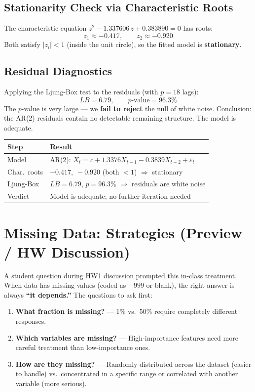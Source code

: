 \documentclass[11pt]{article}
\begin{document}
\subsection{Stationarity Check via Characteristic Roots}
The characteristic equation $z^2 - 1.337606\,z + 0.383890 = 0$ has roots:
\[
z_1 \approx -0.417, \qquad z_2 \approx -0.920
\]
Both satisfy $|z_i| < 1$ (inside the unit circle), so the fitted model is
\textbf{stationary}.

\subsection{Residual Diagnostics}
Applying the Ljung-Box test to the residuals (with $p = 18$ lags):
\[
LB = 6.79, \qquad p\text{-value} = 96.3\%
\]
The $p$-value is very large --- we \textbf{fail to reject} the null of white
noise. Conclusion: the AR(2) residuals contain no detectable remaining structure.
The model is adequate.

\begin{center}
\begin{tabular}{@{}ll@{}}
\toprule
\textbf{Step} & \textbf{Result} \\
\midrule
Model         & AR(2): $X_t = c + 1.3376 X_{t-1} - 0.3839 X_{t-2} + \varepsilon_t$ \\
Char.\ roots  & $-0.417,\; -0.920$ (both $< 1$) $\Rightarrow$ stationary \\
Ljung-Box     & $LB = 6.79$, $p = 96.3\%$ $\Rightarrow$ residuals are white noise \\
Verdict       & Model is adequate; no further iteration needed \\
\bottomrule
\end{tabular}
\end{center}


\section{Missing Data: Strategies (Preview / HW Discussion)}

A student question during HW1 discussion prompted this in-class treatment.
When data has missing values (coded as $-999$ or blank), the right answer is always
\textbf{``it depends.''} The questions to ask first:

\begin{enumerate}
    \item \textbf{What fraction is missing?} --- 1\% vs.\ 50\% require completely
      different responses.
    \item \textbf{Which variables are missing?} --- High-importance features need
      more careful treatment than low-importance ones.
    \item \textbf{How are they missing?} --- Randomly distributed across the
      dataset (easier to handle) vs.\ concentrated in a specific range or
      correlated with another variable (more serious).
\end{enumerate}
\end{document}
